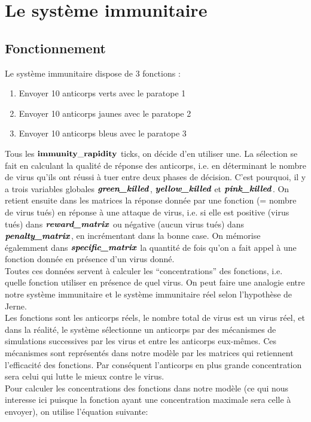 \documentclass[11pt]{article} %
\numberwithin{equation}{section} %
\begin{document}
\newpage
\section{Le système immunitaire}
\subsection{Fonctionnement}
Le système immunitaire dispose de 3 fonctions :
\begin{enumerate}
	\item Envoyer 10 anticorps verts avec le paratope 1 
	\item Envoyer 10 anticorps jaunes avec le paratope 2
	\item Envoyer 10 anticorps bleus avec le paratope 3
\end{enumerate}
Tous les $\bf{immunity\_rapidity}$ ticks, on décide d'en utiliser une. La sélection se fait en calculant la qualité de réponse des anticorps, i.e. en déterminant le nombre de virus qu'ils ont réussi à tuer entre deux phases de décision. C'est pourquoi, il y a trois variables globales $\textbf{\textit{green\_killed}}$, $\textit{\textbf{yellow\_killed}}$ et $\textbf{\textit{pink\_killed}}$. On retient ensuite dans les matrices la réponse donnée par une fonction (= nombre de virus tués) en réponse à une attaque de virus, i.e. si elle est positive (virus tués) dans $\textbf{\textit{reward\_matrix}}$ ou négative (aucun virus tués) dans $\textbf{\textit{penalty\_matrix}}$, en incrémentant dans la bonne case. On mémorise égalemment dans $\textbf{\textit{specific\_matrix}}$ la quantité de fois qu'on a fait appel à une fonction donnée en présence d'un virus donné.
\\
Toutes ces données servent à calculer les ``concentrations'' des fonctions, i.e. quelle fonction utiliser en présence de quel virus. On peut faire une analogie entre notre système immunitaire et le système immunitaire réel selon l'hypothèse de Jerne.
\\
Les fonctions sont les anticorps réels, le nombre total de virus est un virus réel, et dans la réalité, le système sélectionne un anticorps par des mécanismes de simulations successives par les virus et entre les anticorps eux-mêmes. Ces mécanismes sont représentés dans notre modèle par les matrices qui retiennent l'efficacité des fonctions. Par conséquent l'anticorps en plus grande concentration sera celui qui lutte le mieux contre le virus.
\\
Pour calculer les concentrations des fonctions dans notre modèle (ce qui nous interesse ici puisque la fonction ayant une concentration maximale sera celle à envoyer), on utilise l'équation suivante:
\end{document}
